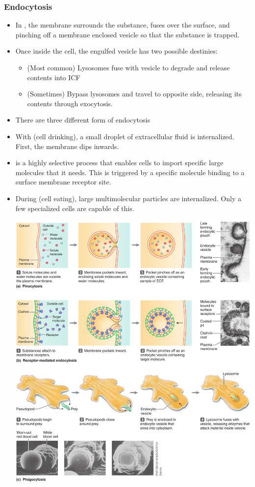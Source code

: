\documentclass{article}
\numberwithin{equation}{section}
\begin{document}
\subsubsection{Endocytosis}
\begin{itemize}
    \item In , the membrane surrounds the substance, fuses over the surface, and pinching off a membrane enclosed vesicle so that the substance is trapped.
    \item Once inside the cell, the engulfed vesicle has two possible destinies:
    \begin{itemize}
        \item (Most common) Lysosomes fuse with vesicle to degrade and release contents into ICF
        \item (Sometimes) Bypass lysosomes and travel to opposite side, releasing its contents through exocytosis.
    \end{itemize}
    \item There are three different form of endocytosis
    \item With  (cell drinking), a small droplet of extracellular fluid is internalized. First, the membrane dips inwards.
    \item {} is a highly selective process that enables cells to import specific large molecules that it needs. This is triggered by a specific molecule binding to a surface membrane receptor site.
    \item During  (cell eating), large multimolecular particles are internalized. Only a few specialized cells are capable of this.
    \begin{center}
        \includegraphics[width=0.8\linewidth]{figures/endocytosis.png}
    \end{center}
\end{itemize}
\end{document}
